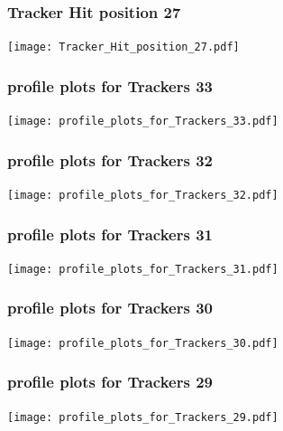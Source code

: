 \documentclass[slidestop,compress,mathserif]{beamer}
\begin{document}
\begin{frame}\frametitle{Tracker Hit position 27}
	 \texttt{[image: Tracker\_Hit\_position\_27.pdf]}
\end{frame}
\begin{frame}\frametitle{profile plots for Trackers 33}
	 \texttt{[image: profile\_plots\_for\_Trackers\_33.pdf]}
\end{frame}
\begin{frame}\frametitle{profile plots for Trackers 32}
	 \texttt{[image: profile\_plots\_for\_Trackers\_32.pdf]}
\end{frame}
\begin{frame}\frametitle{profile plots for Trackers 31}
	 \texttt{[image: profile\_plots\_for\_Trackers\_31.pdf]}
\end{frame}
\begin{frame}\frametitle{profile plots for Trackers 30}
	 \texttt{[image: profile\_plots\_for\_Trackers\_30.pdf]}
\end{frame}
\begin{frame}\frametitle{profile plots for Trackers 29}
	 \texttt{[image: profile\_plots\_for\_Trackers\_29.pdf]}
\end{frame}
\end{document}
